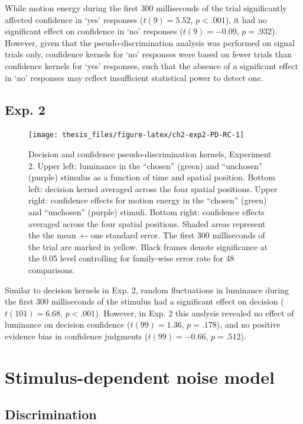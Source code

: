 \documentclass[12pt,twoside]{reedthesis}
\begin{document}
While motion energy during the first 300 milliseconds of the trial significantly affected confidence in `yes' responses (\(t(9) = 5.52\), \(p < .001\)), it had no significant effect on confidence in `no' responses (\(t(9) = -0.09\), \(p = .932\)). However, given that the pseudo-discrimination analysis was performed on signal trials only, confidence kernels for `no' responses were based on fewer trials than confidence kernels for `yes' responses, such that the absence of a significant effect in `no' responses may reflect insufficient statistical power to detect one.

\hypertarget{exp.-2}{%
\subsection{Exp. 2}\label{exp.-2}}


\begin{figure}
\texttt{[image: thesis\_files/figure-latex/ch2-exp2-PD-RC-1]} \caption[Pseudo-discrimination kernels for detection signal trials.]{Decision and confidence pseudo-discrimination kernels, Experiment 2. Upper left: luminance in the ``chosen'' (green) and ``unchosen'' (purple) stimulus as a function of time and spatial position. Bottom left: decision kernel averaged across the four spatial positions. Upper right: confidence effects for motion energy in the ``chosen'' (green) and ``unchosen'' (purple) stimuli. Bottom right: confidence effects averaged across the four spatial positions. Shaded areas represent the the mean +- one standard error. The first 300 milliseconds of the trial are marked in yellow. Black frames denote significance at the 0.05 level controlling for family-wise error rate for 48 comparisons.}\label{fig:ch2-exp2-PD-RC}
\end{figure}
Similar to decision kernels in Exp. 2, random fluctuations in luminance during the first 300 milliseconds of the stimulus had a significant effect on decision (\(t(101) = 6.68\), \(p < .001\)). However, in Exp. 2 this anslysis revealed no effect of luminance on decision confidence (\(t(99) = 1.36\), \(p = .178\)), and no positive evidence bias in confidence judgments (\(t(99) = -0.66\), \(p = .512\)).

\hypertarget{app2-simulation}{%
\section{Stimulus-dependent noise model}\label{app2-simulation}}

\hypertarget{discrimination}{%
\subsection{Discrimination}\label{discrimination}}
\end{document}
